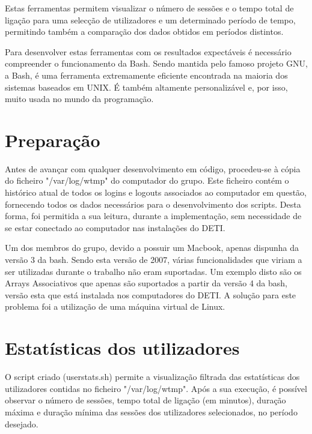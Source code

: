 \documentclass[10pt,portuguese]{article}
\begin{document}
\par Estas ferramentas permitem visualizar o número de sessões e o tempo total de ligação para uma selecção de utilizadores e um determinado período de tempo, permitindo também a comparação dos dados obtidos em períodos distintos.

\par Para desenvolver estas ferramentas com os resultados expectáveis é necessário compreender o funcionamento da Bash. Sendo mantida pelo famoso projeto GNU, a Bash, é uma ferramenta extremamente eficiente encontrada na maioria dos sistemas baseados em UNIX. É também altamente personalizável e, por isso, muito usada no mundo da programação.
 

\clearpage

\section{Preparação}
\par Antes de avançar com qualquer desenvolvimento em código, procedeu-se à cópia do ficheiro "/var/log/wtmp" do computador do grupo. Este ficheiro contém o histórico atual de todos os logins e logouts associados ao computador em questão, fornecendo todos os dados necessários para o desenvolvimento dos scripts. Desta forma, foi permitida a sua leitura, durante a implementação, sem necessidade de se estar conectado ao computador nas instalações do DETI.
\par Um dos membros do grupo, devido a possuir um Macbook, apenas dispunha da versão 3 da bash. Sendo esta versão de 2007, várias funcionalidades que viriam a ser utilizadas durante o trabalho não eram suportadas. Um exemplo disto são os Arrays Associativos que apenas são suportados a partir da versão 4 da bash, versão esta que está instalada nos computadores do DETI. A solução para este problema foi a utilização de uma máquina virtual de Linux.


\clearpage

\section{Estatísticas dos utilizadores}
O script criado (userstats.sh) permite a visualização filtrada das estatísticas dos utilizadores contidas no ficheiro "/var/log/wtmp". Após a sua execução, é possível observar o número de sessões, tempo total de ligação (em minutos), duração máxima e duração mínima das sessões dos utilizadores selecionados, no período desejado.
\end{document}
